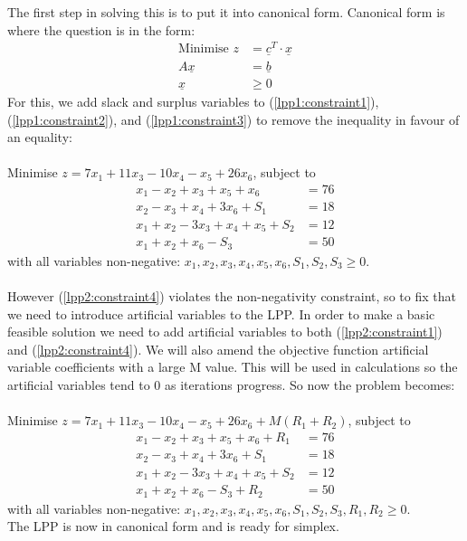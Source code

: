\documentclass{article}
\numberwithin{equation}{section}
\begin{document}
The first step in solving this is to put it into canonical form. Canonical form is where the question is in the form:
\begin{align}
    \text{Minimise }z &= \underline{c}^T \cdot \underline{x} \\
    A\underline{x} &= \underline{b} \\
    \underline{x} &\geq 0
\end{align}
For this, we add slack and surplus variables to (\ref{lpp1:constraint1}), (\ref{lpp1:constraint2}), and (\ref{lpp1:constraint3}) to remove the inequality in favour of an equality: \\ \\
Minimise $z = 7x_1 + 11x_3 - 10x_4 - x_5 + 26x_6$, subject to
\begin{align}
    x_1 - x_2 + x_3 + x_5 + x_6 &= 76 \label{lpp2:constraint1} \\
    x_2 - x_3 + x_4 + 3x_6 + S_1 &= 18 \label{lpp2:constraint2} \\
    x_1 + x_2 - 3x_3 + x_4 + x_5 + S_2 &= 12 \label{lpp2:constraint3} \\
    x_1 + x_2 + x_6 - S_3&= 50 \label{lpp2:constraint4}
\end{align}
with all variables non-negative: $x_1, x_2, x_3, x_4, x_5, x_6, S_1, S_2, S_3\geq 0$.\\ \\
However (\ref{lpp2:constraint4}) violates the non-negativity constraint, so to fix that we need to introduce artificial variables to the LPP. In order to make a basic feasible solution we need to add artificial variables to both (\ref{lpp2:constraint1}) and (\ref{lpp2:constraint4}). We will also amend the objective function artificial variable coefficients with a large M value. This will be used in calculations so the artificial variables tend to 0 as iterations progress. So now the problem becomes: \\ \\
Minimise $z = 7x_1 + 11x_3 - 10x_4 - x_5 + 26x_6 + M(R_1 + R_2)$, subject to
\begin{align}
    x_1 - x_2 + x_3 + x_5 + x_6 + R_1&= 76 \\
    x_2 - x_3 + x_4 + 3x_6 + S_1 &= 18 \\
    x_1 + x_2 - 3x_3 + x_4 + x_5 + S_2 &= 12 \\
    x_1 + x_2 + x_6 - S_3 +R_2 &= 50
\end{align}
with all variables non-negative: $x_1, x_2, x_3, x_4, x_5, x_6, S_1, S_2, S_3, R_1, R_2\geq 0$.\\
\newpage
The LPP is now in canonical form and is ready for simplex.
\end{document}
